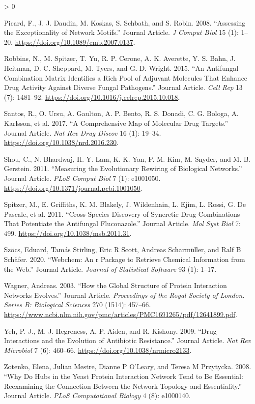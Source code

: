 \documentclass[
]{article}
\newlength{\cslhangindent}
\newenvironment{CSLReferences}[2] %
 {%
  \setlength{\parindent}{0pt}
  \ifodd #1 \everypar{\setlength{\hangindent}{\cslhangindent}}\ignorespaces\fi
  \ifnum #2 > 0
  \setlength{\parskip}{#2\baselineskip}
  \fi
 }%
 {}
\begin{document}
\begin{CSLReferences}{1}{0}
\leavevmode\hypertarget{ref-Picard2008}{}%
Picard, F., J. J. Daudin, M. Koskas, S. Schbath, and S. Robin. 2008. {``Assessing the Exceptionality of Network Motifs.''} Journal Article. \emph{J Comput Biol} 15 (1): 1--20. \url{https://doi.org/10.1089/cmb.2007.0137}.

\leavevmode\hypertarget{ref-Robbins2015}{}%
Robbins, N., M. Spitzer, T. Yu, R. P. Cerone, A. K. Averette, Y. S. Bahn, J. Heitman, D. C. Sheppard, M. Tyers, and G. D. Wright. 2015. {``An Antifungal Combination Matrix Identifies a Rich Pool of Adjuvant Molecules That Enhance Drug Activity Against Diverse Fungal Pathogens.''} Journal Article. \emph{Cell Rep} 13 (7): 1481--92. \url{https://doi.org/10.1016/j.celrep.2015.10.018}.

\leavevmode\hypertarget{ref-Santos2017}{}%
Santos, R., O. Ursu, A. Gaulton, A. P. Bento, R. S. Donadi, C. G. Bologa, A. Karlsson, et al. 2017. {``A Comprehensive Map of Molecular Drug Targets.''} Journal Article. \emph{Nat Rev Drug Discov} 16 (1): 19--34. \url{https://doi.org/10.1038/nrd.2016.230}.

\leavevmode\hypertarget{ref-Shou2011}{}%
Shou, C., N. Bhardwaj, H. Y. Lam, K. K. Yan, P. M. Kim, M. Snyder, and M. B. Gerstein. 2011. {``Measuring the Evolutionary Rewiring of Biological Networks.''} Journal Article. \emph{PLoS Comput Biol} 7 (1): e1001050. \url{https://doi.org/10.1371/journal.pcbi.1001050}.

\leavevmode\hypertarget{ref-Spitzer2011}{}%
Spitzer, M., E. Griffiths, K. M. Blakely, J. Wildenhain, L. Ejim, L. Rossi, G. De Pascale, et al. 2011. {``Cross-Species Discovery of Syncretic Drug Combinations That Potentiate the Antifungal Fluconazole.''} Journal Article. \emph{Mol Syst Biol} 7: 499. \url{https://doi.org/10.1038/msb.2011.31}.

\leavevmode\hypertarget{ref-Szocs2020}{}%
Szöcs, Eduard, Tamás Stirling, Eric R Scott, Andreas Scharmüller, and Ralf B Schäfer. 2020. {``Webchem: An r Package to Retrieve Chemical Information from the Web.''} Journal Article. \emph{Journal of Statistical Software} 93 (1): 1--17.

\leavevmode\hypertarget{ref-Wagner2003}{}%
Wagner, Andreas. 2003. {``How the Global Structure of Protein Interaction Networks Evolves.''} Journal Article. \emph{Proceedings of the Royal Society of London. Series B: Biological Sciences} 270 (1514): 457--66. \url{https://www.ncbi.nlm.nih.gov/pmc/articles/PMC1691265/pdf/12641899.pdf}.

\leavevmode\hypertarget{ref-Yeh2009}{}%
Yeh, P. J., M. J. Hegreness, A. P. Aiden, and R. Kishony. 2009. {``Drug Interactions and the Evolution of Antibiotic Resistance.''} Journal Article. \emph{Nat Rev Microbiol} 7 (6): 460--66. \url{https://doi.org/10.1038/nrmicro2133}.

\leavevmode\hypertarget{ref-Zotenko2008}{}%
Zotenko, Elena, Julian Mestre, Dianne P O'Leary, and Teresa M Przytycka. 2008. {``Why Do Hubs in the Yeast Protein Interaction Network Tend to Be Essential: Reexamining the Connection Between the Network Topology and Essentiality.''} Journal Article. \emph{PLoS Computational Biology} 4 (8): e1000140.

\end{CSLReferences}
\end{document}
